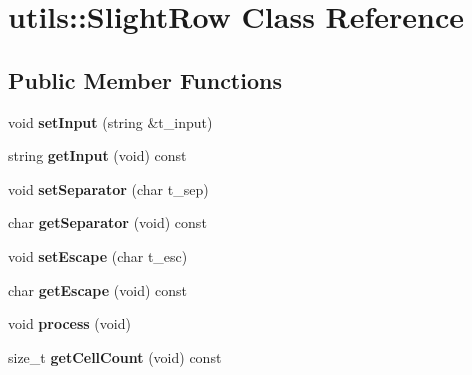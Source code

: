 \hypertarget{classutils_1_1SlightRow}{}\section{utils\+:\+:Slight\+Row Class Reference}
\label{classutils_1_1SlightRow}
\subsection*{Public Member Functions}
\begin{DoxyCompactItemize}
\item 
\mbox{\label{classutils_1_1SlightRow_abb27b43d2dbe46d47805c05f7b87ab82}} 
void {\bfseries set\+Input} (string \&t\+\_\+input)
\item 
\mbox{\label{classutils_1_1SlightRow_a8491ac21fba9e5c258e7c1a3bf3da26a}} 
string {\bfseries get\+Input} (void) const
\item 
\mbox{\label{classutils_1_1SlightRow_ad26f06a994890c68fedb45ba1e95f25d}} 
void {\bfseries set\+Separator} (char t\+\_\+sep)
\item 
\mbox{\label{classutils_1_1SlightRow_a1095fd58142659bd85871622ab3d9b1c}} 
char {\bfseries get\+Separator} (void) const
\item 
\mbox{\label{classutils_1_1SlightRow_abdee6f0ba2d0e6ce32cc8e21020f2218}} 
void {\bfseries set\+Escape} (char t\+\_\+esc)
\item 
\mbox{\label{classutils_1_1SlightRow_a75266f8f076b39135677cf54dcff986c}} 
char {\bfseries get\+Escape} (void) const
\item 
\mbox{\label{classutils_1_1SlightRow_a9774969c2a0276491ab368216c2592a0}} 
void {\bfseries process} (void)
\item 
\mbox{\label{classutils_1_1SlightRow_af7df52464ce8151d7c3c429d0a796c7f}} 
size\+\_\+t {\bfseries get\+Cell\+Count} (void) const
\item 
\mbox{\label{classutils_1_1SlightRow_ab06e2a27035951ff80edf834b430c829}} 

\end{DoxyCompactItemize}
